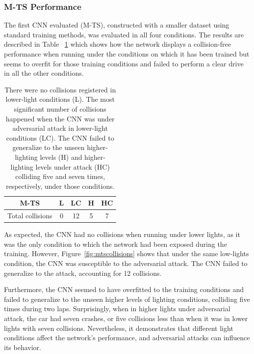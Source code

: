 \documentclass[12pt]{article}
\begin{document}
\subsubsection{M-TS Performance}

The first CNN evaluated (M-TS), constructed with a smaller dataset using standard training methods, was evaluated in all four conditions. The results are described in Table ~\ref{tab:mts} which shows how the network displays a collision-free performance when running under the conditions on which it has been trained but seems to overfit for those training conditions and failed to perform a clear drive in all the other conditions. 

\begin{table}[H]
\begin{center}
\begin{tabular}{ |c|c|c|c|c| } 
\hline
M-TS & L & LC & H & HC \\
\hline
Total collisions & 0 & 12 & 5 & 7 \\
\hline
\end{tabular}
\caption{\label{tab:mts}There were no collisions registered in lower-light conditions (L). The most significant number of collisions happened when the CNN was under adversarial attack in lower-light conditions (LC). The CNN failed to generalize to the unseen higher-lighting levels (H) and higher-lighting levels under attack (HC) colliding five and seven times, respectively, under those conditions.}
\end{center}
\end{table}

As expected, the CNN had no collisions when running under lower lights, as it was the only condition to which the network had been exposed during the training. However, Figure~\ref{fig:mtscollisions} shows that under the same low-lights condition, the CNN was susceptible to the adversarial attack. The CNN failed to generalize to the attack, accounting for 12 collisions.

Furthermore, the CNN seemed to have overfitted to the training conditions and failed to generalize to the unseen higher levels of lighting conditions, colliding five times during two laps. Surprisingly, when in higher lights under adversarial attack, the car had seven crashes, or five collisions less than when it was in lower lights with seven collisions. Nevertheless, it demonstrates that different light conditions affect the network's performance, and adversarial attacks can influence its behavior. 
\end{document}
